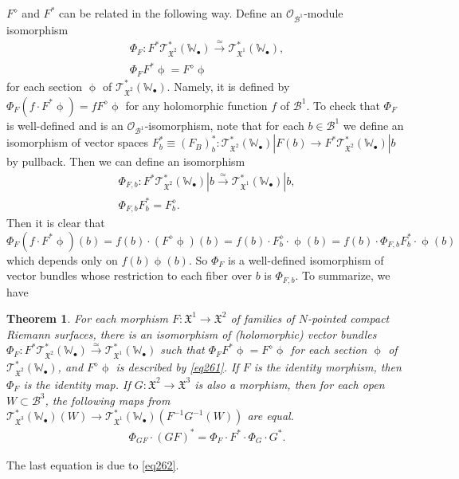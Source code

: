 \documentclass[12pt,b5paper,notitlepage]{report}
\theoremstyle{definition}
\theoremstyle{plain}
\newtheorem{thm}[df]{Theorem}
\newcommand{\fk}{\mathfrak}
\newcommand{\mc}{\mathcal}
\newcommand{\scr}{\mathscr}
\newcommand{\blt}{\bullet}
\newcommand{\Wbb}{\mathbb W}
\numberwithin{equation}{section}
\begin{document}
 
$F^\diamond$ and $F^*$ can be related in the following way. Define an $\scr O_{\mc B^1}$-module  isomorphism
\begin{gather}
\Phi_F:F^*\scr T_{\fk X^2}^*(\Wbb_\blt)\xrightarrow{\simeq} \scr T_{\fk X^1}^*(\Wbb_\blt),\nonumber\\
\Phi_F F^*\upphi=F^\diamond\upphi
\end{gather}
for each section $\upphi$ of $\scr T_{\fk X^2}^*(\Wbb_\blt)$. Namely, it is defined by $\Phi_F (f\cdot F^*\upphi)=fF^\diamond\upphi$ for any holomorphic function $f$ of $\mc B^1$. To check that $\Phi_F$ is well-defined and is an $\scr O_{\mc B^1}$-isomorphism, note that for each $b\in \mc B^1$ we define an isomorphism of vector spaces $F_b^*\equiv (F_B)_b^*:\scr T_{\fk X^2}^*(\Wbb_\blt)|F(b)\rightarrow F^*\scr T_{\fk X^2}^*(\Wbb_\blt)|b$ by pullback. Then we can define an isomorphism
\begin{gather*}
\Phi_{F,b}:F^*\scr T_{\fk X^2}^*(\Wbb_\blt)|b\xrightarrow{\simeq} \scr T_{\fk X^1}^*(\Wbb_\blt)|b,\\
\Phi_{F,b}F^*_b=F_b^\diamond.
\end{gather*}
Then it is clear that $\Phi_F(f\cdot  F^*\upphi)(b)=f(b)\cdot (F^\diamond\upphi)(b)=f(b)\cdot F_b^\diamond\cdot \upphi(b)=f(b)\cdot \Phi_{F,b}F^*_b\cdot \upphi(b)$ which depends only on $f(b)\upphi(b)$. So $\Phi_F$ is a well-defined isomorphism of vector bundles whose restriction to each fiber over $b$ is $\Phi_{F,b}$. To summarize, we have
\begin{thm}
For each morphism $F:\fk X^1\rightarrow\fk X^2$ of families of $N$-pointed compact Riemann surfaces, there is an isomorphism of (holomorphic) vector bundles $\Phi_F:F^*\scr T_{\fk X^2}^*(\Wbb_\blt)\xrightarrow{\simeq} \scr T_{\fk X^1}^*(\Wbb_\blt)$ such that $\Phi_F F^*\upphi=F^\diamond\upphi$ for each section $\upphi$ of $\scr T_{\fk X^2}^*(\Wbb_\blt)$, and $F^\diamond\upphi$ is described by \eqref{eq261}. If $F$ is the identity morphism, then $\Phi_F$ is the identity map. If $G:\fk X^2\rightarrow\fk X^3$ is also a morphism, then for each open $W\subset\mc B^3$, the following maps from $\scr T_{\fk X^3}^*(\Wbb_\blt)(W)\rightarrow \scr T_{\fk X^1}^*(\Wbb_\blt)(F^{-1}G^{-1}(W))$ are equal.
\begin{align*}
\Phi_{GF}\cdot (GF)^*=\Phi_F \cdot F^*\cdot  \Phi_G\cdot  G^*.
\end{align*}
\end{thm}
The last equation is due to \eqref{eq262}.
\end{document}

